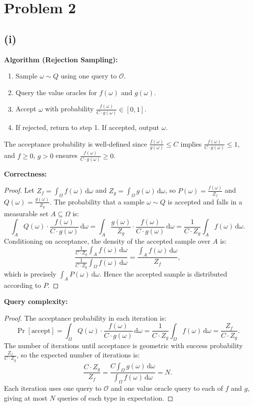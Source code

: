 \section*{Problem 2}
\subsection*{(i)}

\textbf{Algorithm (Rejection Sampling):}
\begin{enumerate}
\item Sample $\omega \sim Q$ using one query to $\mathcal{O}$.
\item Query the value oracles for $f(\omega)$ and $g(\omega)$.
\item Accept $\omega$ with probability $\frac{f(\omega)}{C \cdot g(\omega)} \in [0,1]$.
\item If rejected, return to step 1. If accepted, output $\omega$.
\end{enumerate}

The acceptance probability is well-defined since $\frac{f(\omega)}{g(\omega)} \leq C$ implies $\frac{f(\omega)}{C \cdot g(\omega)} \leq 1$, and $f \geq 0$, $g > 0$ ensures $\frac{f(\omega)}{C \cdot g(\omega)} \geq 0$.

\textbf{Correctness:}
\begin{proof}
Let $Z_f = \int_\Omega f(\omega)\,\mathrm{d}\omega$ and $Z_g = \int_\Omega g(\omega)\,\mathrm{d}\omega$, so $P(\omega) = \frac{f(\omega)}{Z_f}$ and $Q(\omega) = \frac{g(\omega)}{Z_g}$. The probability that a sample $\omega \sim Q$ is accepted and falls in a measurable set $A \subseteq \Omega$ is:
\[
\int_A Q(\omega) \cdot \frac{f(\omega)}{C \cdot g(\omega)}\,\mathrm{d}\omega = \int_A \frac{g(\omega)}{Z_g} \cdot \frac{f(\omega)}{C \cdot g(\omega)}\,\mathrm{d}\omega = \frac{1}{C \cdot Z_g} \int_A f(\omega)\,\mathrm{d}\omega.
\]
Conditioning on acceptance, the density of the accepted sample over $A$ is:
\[
\frac{\frac{1}{C \cdot Z_g} \int_A f(\omega)\,\mathrm{d}\omega}{\frac{1}{C \cdot Z_g} \int_\Omega f(\omega)\,\mathrm{d}\omega} = \frac{\int_A f(\omega)\,\mathrm{d}\omega}{Z_f},
\]
which is precisely $\int_A P(\omega)\,\mathrm{d}\omega$. Hence the accepted sample is distributed according to $P$.
\end{proof}

\textbf{Query complexity:}
\begin{proof}
The acceptance probability in each iteration is:
\[
\Pr[\text{accept}] = \int_\Omega Q(\omega) \cdot \frac{f(\omega)}{C \cdot g(\omega)}\,\mathrm{d}\omega = \frac{1}{C \cdot Z_g} \int_\Omega f(\omega)\,\mathrm{d}\omega = \frac{Z_f}{C \cdot Z_g}.
\]
The number of iterations until acceptance is geometric with success probability $\frac{Z_f}{C \cdot Z_g}$, so the expected number of iterations is:
\[
\frac{C \cdot Z_g}{Z_f} = \frac{C \int_\Omega g(\omega)\,\mathrm{d}\omega}{\int_\Omega f(\omega)\,\mathrm{d}\omega} = N.
\]
Each iteration uses one query to $\mathcal{O}$ and one value oracle query to each of $f$ and $g$, giving at most $N$ queries of each type in expectation.
\end{proof}

